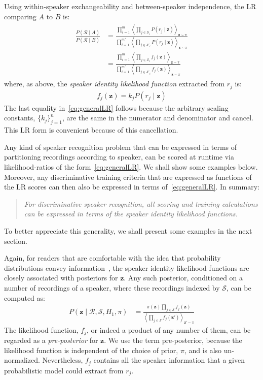 \documentclass[a4paper,oneside,12pt,english]{report}
\def\zvec{\mathbf{z}}
\def\expvb#1#2{\left\langle#1\right\rangle_{#2}}
\def\Rset{\mathcal{R}}
\def\Sset{\mathcal{S}}
\begin{document}
Using within-speaker exchangeability and between-speaker independence, the LR comparing $A$ to $B$ is:
\begin{align}
\label{eq:generalLR}
\begin{split}
\frac{P(\Rset\mid A)}{P(\Rset\mid B)} &=
\frac{\prod_{i=1}^m \expvb{\prod_{j\in\Sset_i} P(r_j\mid\zvec)}{\zvec\sim\pi}}
{\prod_{i=1}^{m'} \expvb{\prod_{j\in\Sset'_i} P(r_j\mid\zvec)}{\zvec\sim\pi}} \\
&= \frac{\prod_{i=1}^m \expvb{\prod_{j\in\Sset_i} f_j(\zvec)}{\zvec\sim\pi}}
{\prod_{i=1}^{m'} \expvb{\prod_{j\in\Sset'_i} f_j(\zvec)}{\zvec\sim\pi}} 
\end{split}
\end{align}
where, as above, the \emph{speaker identity likelihood function} extracted from $r_j$ is:
\begin{align}
f_j(\zvec)=k_jP(r_j\mid\zvec)
\end{align}
The last equality in~\eqref{eq:generalLR} follows because the arbitrary scaling constants, $\{k_j\}_{j=1}^n$, are the same in the numerator and denominator and cancel. This LR form is convenient because of this cancellation.

Any kind of speaker recognition problem that can be expressed in terms of partitioning recordings according to speaker, can be scored at runtime via likelihood-ratios of the form~\eqref{eq:generalLR}. We shall show some examples below.  Moreover, any discriminative training criteria that are expressed as functions of the LR scores can then also be expressed in terms of~\eqref{eq:generalLR}. In summary: 
\begin{quote}
\emph{For discriminative speaker recognition, all scoring and training calculations can be expressed in terms of the speaker identity likelihood functions.} 
\end{quote}
To better appreciate this generality, we shall present some examples in the next section.

Again, for readers that are comfortable with the idea that probability distributions convey information~\cite{PTLOS}, the speaker identity likelihood functions are closely associated with posteriors for $\zvec$. Any such posterior, conditioned on a number of recordings of a speaker, where these recordings indexed by $\Sset$, can be computed as:
\begin{align}
P(\zvec\mid \Rset,\Sset,H_1,\pi) &=\frac{\pi(\zvec)\prod_{j\in\Sset}f_j(\zvec)}{\expvb{\prod_{j\in\Sset}f_j(\zvec')}{\zvec'\sim\pi}}
\end{align}
The likelihood function, $f_j$, or indeed a product of any number of them, can be regarded as a \emph{pre-posterior} for $\zvec$. We use the term pre-posterior, because the likelihood function is independent of the choice of prior, $\pi$, and is also un-normalized. Nevertheless, $f_j$ contains all the speaker information that a given probabilistic model could extract from $r_j$.
\end{document}
